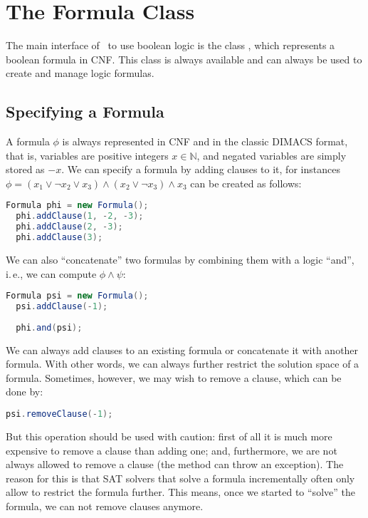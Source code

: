 \documentclass[a4paper, ukenglish, twoside, openright]{jdrasilmanual}
\begin{document}
\section{The Formula Class}\label{section:satFormula}
The main interface of \Jdrasil\ to use boolean logic is the class
, which represents a boolean formula in
CNF. This class is always available and can always be used to create
and manage logic formulas. 

\subsection{Specifying a Formula}
A formula $\phi$ is always represented in CNF and in the classic
DIMACS format, that is, variables are positive integers
$x\in\mathbb{N}$, and negated variables are simply stored as $-x$. We
can specify a formula by adding clauses to it, for instances
$\phi=(x_1\vee\neg x_2\vee x_3)\wedge(x_2\vee\neg x_3)\wedge x_3$ can
be created as follows:

\begin{lstlisting}[language=Java]
  Formula phi = new Formula();
  phi.addClause(1, -2, -3);
  phi.addClause(2, -3);
  phi.addClause(3);
\end{lstlisting}

We can also ``concatenate'' two formulas by combining them with a logic
``and'', i.\,e., we can compute $\phi\wedge\psi$:

\begin{lstlisting}[language=Java]
  Formula psi = new Formula();
  psi.addClause(-1);
  
  phi.and(psi);
\end{lstlisting}

We can always add clauses to an existing formula or concatenate it
with another formula. With other words, we can always further
restrict the solution space of a formula. Sometimes, however, we may
wish to remove a clause, which can be done by:
\begin{lstlisting}[language=Java]
  psi.removeClause(-1);
\end{lstlisting}
But this operation should be used with caution: first of all it is
much more expensive to remove a clause than adding one; and,
furthermore, we are not always allowed to remove a clause (the method
can throw an exception). The reason for this is that SAT solvers that
solve a formula incrementally often only allow to restrict the formula
further. This means, once we started to ``solve'' the formula, we
can not remove clauses anymore.
\end{document}
